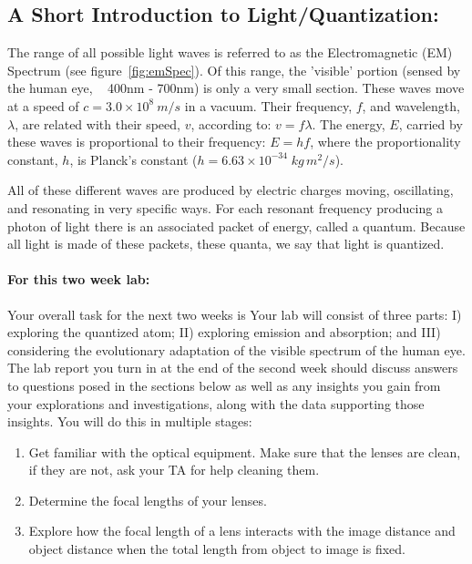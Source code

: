 \subsection*{A Short Introduction to Light/Quantization:}
The range of all possible light waves is referred to as the Electromagnetic (EM) Spectrum (see figure~\ref{fig:emSpec}). 
Of this range, the 'visible' portion (sensed by the human eye, ~ 400nm - 700nm) is only a very small section. 
These waves move at a speed of $c = 3.0 \times 10^{8} \: m/s$ in a vacuum. 
Their frequency, $f$, and wavelength, $\lambda$, are related with their speed, $v$, according to: $v = f \lambda$. 
The energy, $E$, carried by these waves is proportional to their frequency: $E = h f$, where the proportionality constant, $h$, is Planck's constant ($h = 6.63 \times 10^{-34} \; kg \, m^{2}/s$). 
\par
All of these different waves are produced by electric charges moving, oscillating, and resonating in very specific ways. 
For each resonant frequency producing a photon of light there is an associated packet of energy, called a quantum. 
Because all light is made of these packets, these quanta, we say that light is quantized.

\paragraph{For this two week lab:} Your overall task for the next two weeks is Your lab will consist of three parts: I) exploring the quantized atom; II) exploring emission and absorption; and III) considering the evolutionary adaptation of the visible spectrum of the human eye. 
The lab report you turn in at the end of the second week should discuss answers to questions posed in the sections below as well as any insights you gain from your explorations and investigations, along with the data supporting those insights.
You will do this in multiple stages:
\begin{enumerate}
\itemsep-0.2em
\item Get familiar with the optical equipment. Make sure that the lenses are clean, if they are not, ask your TA for help cleaning them.
\item Determine the focal lengths of your lenses.
\item Explore how the focal length of a lens interacts with the image distance and object distance when the total length from object to image is fixed.
\end{enumerate}

